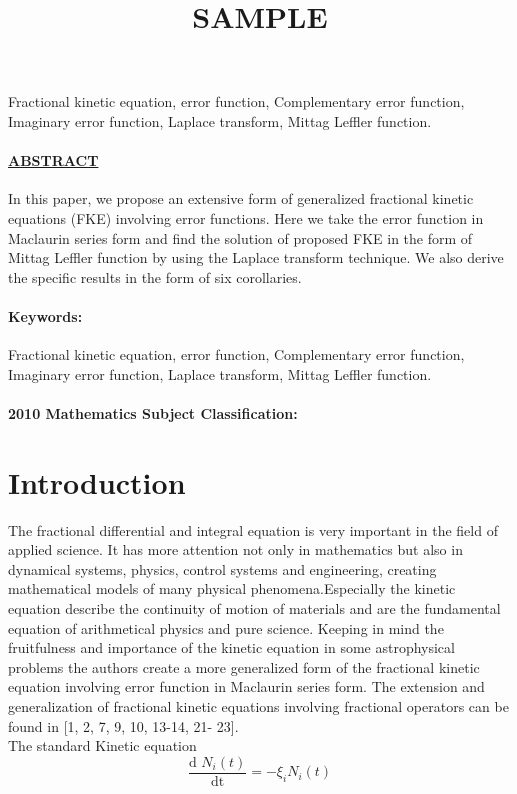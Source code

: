 \documentclass{article}
\title{SAMPLE}
\date{}
\begin{document}
\maketitle
{}
\newcommand{\frsum}[1][Work]{
    \frac{2}{\sqrt{\pi}}
    $\sum$}Fractional kinetic equation, error function, Complementary error function, Imaginary error function, Laplace transform, Mittag Leffler function.
\paragraph{\textbf{\underline{ABSTRACT}}}
In this paper, we propose an extensive form of generalized fractional kinetic equations (FKE) involving error functions. Here we take the error function in Maclaurin series form and find the solution of proposed FKE in the form of Mittag Leffler function by using the Laplace transform technique. We also derive the specific results in the form of six corollaries.

\paragraph{Keywords:}
Fractional kinetic equation, error function, Complementary error function, Imaginary error function, Laplace transform, Mittag Leffler function.

\paragraph{2010 Mathematics Subject Classification:} 

\section{Introduction}
The fractional differential and integral equation is very important in the field of applied science. It has more attention not only in mathematics but also in dynamical systems, physics, control systems and engineering, creating mathematical models of many physical phenomena.Especially the kinetic equation describe the continuity of motion of materials and are the fundamental equation of arithmetical physics and pure science. Keeping in mind the fruitfulness and importance of the kinetic equation in some astrophysical problems the authors create a more generalized form of the fractional kinetic equation involving error function in Maclaurin series form. The extension and generalization of fractional kinetic equations involving fractional operators can be found in [1, 2, 7, 9, 10, 13-14, 21- 23].\\
The standard Kinetic equation
\begin{equation}
    \frac{\text{d $N_i(t)$}}{\text{dt}}
    = -\xi _i N_i(t)
\end{equation}
\end{document}
